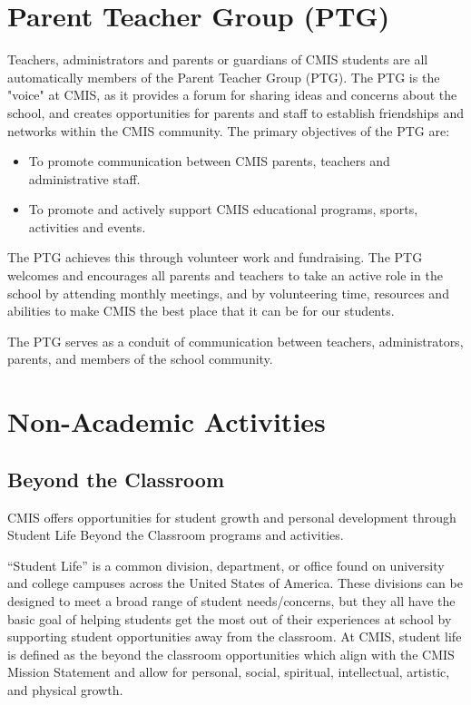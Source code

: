 \section{Parent Teacher Group (PTG)}

Teachers, administrators and parents or guardians of CMIS students are all automatically members of the Parent Teacher Group (PTG). The PTG is the "voice" at CMIS, as it provides a forum for sharing ideas and concerns about the school, and creates opportunities for parents and staff to establish friendships and networks within the CMIS community. The primary objectives of the PTG are:

\begin{itemize}
\item To promote communication between CMIS parents, teachers and administrative staff.
\item To promote and actively support CMIS educational programs, sports, activities and events.
\end{itemize}
 
The PTG achieves this through volunteer work and fundraising.  The PTG welcomes and encourages all parents and teachers to take an active role in the school by attending monthly meetings, and by volunteering time, resources and abilities to make CMIS the best place that it can be for our students.

The PTG serves as a conduit of communication between teachers, administrators, parents, and members of the school community.  

\section{Non-Academic Activities}

\subsection{Beyond the Classroom}

CMIS offers opportunities for student growth and personal development through Student Life Beyond the Classroom programs and activities.  


“Student Life” is a common division, department, or office found on university and college campuses across the United States of America.  These divisions can be designed to meet a broad range of student needs/concerns, but they all have the basic goal of helping students get the most out of their experiences at school by supporting student opportunities away from the classroom.  At CMIS, student life is defined as the beyond the classroom opportunities which align with the CMIS Mission Statement and allow for personal, social, spiritual, intellectual, artistic, and physical growth.


